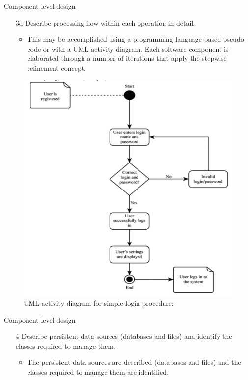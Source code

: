 \documentclass{beamer}
\begin{document}
\begin{frame}{Component level design}
	\begin{itemize}
		\item[3d] Describe processing flow within each operation in detail. 
		\begin{itemize}
			\item This may be
			accomplished using a programming language-based pseudo code or with a UML
			activity diagram. Each software component is elaborated through a number of
			iterations that apply the stepwise refinement concept.
			
		\end{itemize}
	
	\end{itemize}	


\begin{figure}
	\includegraphics[scale=.33]{img/m2_51.jpg}
	\caption{UML activity 
		diagram for 
		simple login procedure: }
\end{figure}
\end{frame}
\begin{frame}{Component level design}
	\begin{itemize}
		\item[4] Describe persistent data sources (databases and files) and identify the
		classes required to manage them. 
		\begin{itemize}
			\item The persistent data sources are described (databases and files) and the classes required to 
			manage them are identified.
		\end{itemize}
	\end{itemize}	
\end{frame}
\end{document}
